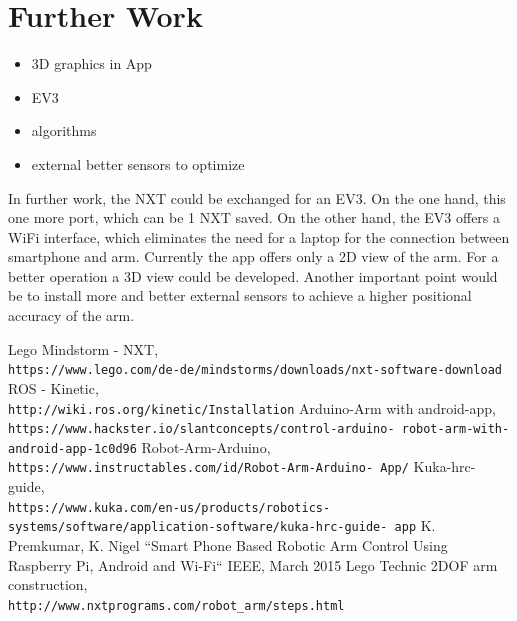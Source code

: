 \documentclass[conference]{IEEEtran}
\begin{document}
\section{Further Work}
\begin{itemize}
	\item 3D graphics in App
	\item EV3
	\item algorithms
	\item external better sensors to optimize
\end{itemize}
In further work, the NXT could be exchanged for an EV3. On the one hand, this one more port, which can be 1 NXT saved. On the other hand, the EV3 offers a WiFi interface, which eliminates the need for a laptop for the connection between smartphone and arm.
Currently the app offers only a 2D view of the arm. For a better operation a 3D view could be developed.
Another important point would be to install more and better external sensors to achieve a higher positional accuracy of the arm.

\begin{thebibliography}{00}
Lego Mindstorm - NXT,
\\\texttt{https://www.lego.com/de-de/mindstorms/downloads/nxt-software-download}
ROS - Kinetic,
\\\texttt{http://wiki.ros.org/kinetic/Installation}
Arduino-Arm with android-app,
\\\texttt{https://www.hackster.io/slantconcepts/control-arduino-
	robot-arm-with-android-app-1c0d96}
Robot-Arm-Arduino,
\\\texttt{https://www.instructables.com/id/Robot-Arm-Arduino-
	App/}
Kuka-hrc-guide,
\\\texttt{https://www.kuka.com/en-us/products/robotics-
	systems/software/application-software/kuka-hrc-guide-
	app}
K. Premkumar, K. Nigel ``Smart Phone Based Robotic Arm Control Using
Raspberry Pi, Android and Wi-Fi`` IEEE, March 2015
Lego Technic 2DOF arm construction,
\\\texttt{http://www.nxtprograms.com/robot\_arm/steps.html}

\end{thebibliography}
\end{document}
